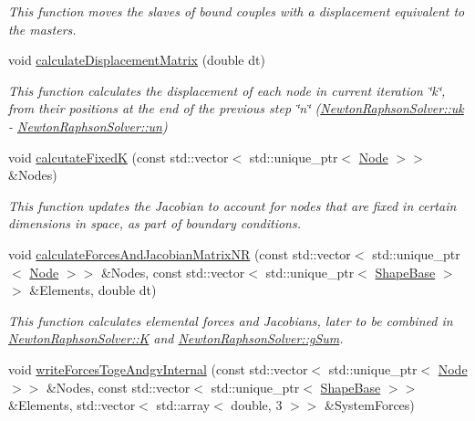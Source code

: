 \begin{DoxyCompactItemize}
\begin{DoxyCompactList}\small\item\em This function moves the slaves of bound couples with a displacement equivalent to the masters\textquotesingle{}. \end{DoxyCompactList}\item 
void \hyperlink{classNewtonRaphsonSolver_aa0ce333a40397fd113f9b9fc47bcb6ca}{calculate\+Displacement\+Matrix} (double dt)
\begin{DoxyCompactList}\small\item\em This function calculates the displacement of each node in current iteration \char`\"{}k\char`\"{}, from their positions at the end of the previous step \char`\"{}n\char`\"{} (\hyperlink{classNewtonRaphsonSolver_ad217268afdeb4838d3b58f075762de95}{Newton\+Raphson\+Solver\+::uk} -\/ \hyperlink{classNewtonRaphsonSolver_a89a6e2f583c785b77b967e6f0e9f5893}{Newton\+Raphson\+Solver\+::un}) \end{DoxyCompactList}\item 
void \hyperlink{classNewtonRaphsonSolver_acfaaed8f038167756f352b566b8455d7}{calcutate\+Fixed\+K} (const std\+::vector$<$ std\+::unique\+\_\+ptr$<$ \hyperlink{classNode}{Node} $>$$>$ \&Nodes)
\begin{DoxyCompactList}\small\item\em This function updates the Jacobian to account for nodes that are fixed in certain dimensions in space, as part of boundary conditions. \end{DoxyCompactList}\item 
void \hyperlink{classNewtonRaphsonSolver_a5793ee41a3a4d97c0c944347f1f6da8e}{calculate\+Forces\+And\+Jacobian\+Matrix\+N\+R} (const std\+::vector$<$ std\+::unique\+\_\+ptr$<$ \hyperlink{classNode}{Node} $>$$>$ \&Nodes, const std\+::vector$<$ std\+::unique\+\_\+ptr$<$ \hyperlink{classShapeBase}{Shape\+Base} $>$$>$ \&Elements, double dt)
\begin{DoxyCompactList}\small\item\em This function calculates elemental forces and Jacobians, later to be combined in \hyperlink{classNewtonRaphsonSolver_a4e9ffc424dd37c6c00f9de3d7ac455ed}{Newton\+Raphson\+Solver\+::\+K} and \hyperlink{classNewtonRaphsonSolver_a843bd105e92dfa1c9205e4efa134a406}{Newton\+Raphson\+Solver\+::g\+Sum}. \end{DoxyCompactList}\item 
\hypertarget{classNewtonRaphsonSolver_aca7345c1d02bf38b1c36cf1f5110f869}{}void \hyperlink{classNewtonRaphsonSolver_aca7345c1d02bf38b1c36cf1f5110f869}{write\+Forces\+Toge\+Andgv\+Internal} (const std\+::vector$<$ std\+::unique\+\_\+ptr$<$ \hyperlink{classNode}{Node} $>$$>$ \&Nodes, const std\+::vector$<$ std\+::unique\+\_\+ptr$<$ \hyperlink{classShapeBase}{Shape\+Base} $>$$>$ \&Elements, std\+::vector$<$ std\+::array$<$ double, 3 $>$$>$ \&System\+Forces)\label{classNewtonRaphsonSolver_aca7345c1d02bf38b1c36cf1f5110f869}


\end{DoxyCompactItemize}
